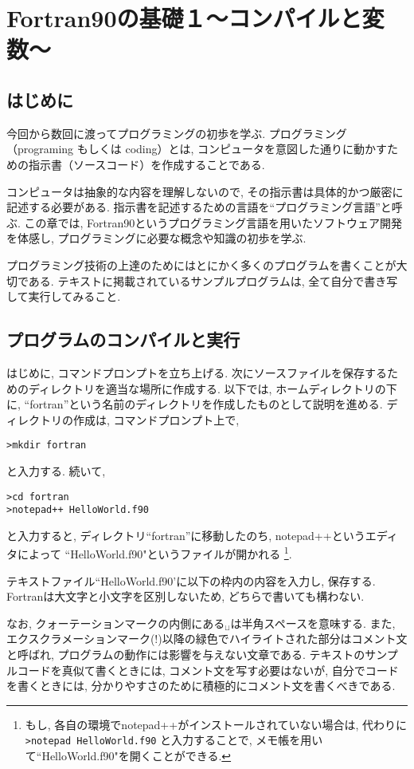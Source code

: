 \chapter{Fortran90の基礎１〜コンパイルと変数〜}

\section{はじめに}
今回から数回に渡ってプログラミングの初歩を学ぶ.
プログラミング（programing もしくは coding）とは,
コンピュータを意図した通りに動かすための指示書（ソースコード）を作成することである.

コンピュータは抽象的な内容を理解しないので, その指示書は具体的かつ厳密に記述する必要がある.
指示書を記述するための言語を``プログラミング言語''と呼ぶ.
この章では, Fortran90というプログラミング言語を用いたソフトウェア開発を体感し,
プログラミングに必要な概念や知識の初歩を学ぶ.

プログラミング技術の上達のためにはとにかく多くのプログラムを書くことが大切である.
テキストに掲載されているサンプルプログラムは,
全て自分で書き写して実行してみること.

\section{プログラムのコンパイルと実行}
はじめに, コマンドプロンプトを立ち上げる.
次にソースファイルを保存するためのディレクトリを適当な場所に作成する.
以下では, ホームディレクトリの下に, ``fortran''という名前のディレクトリを作成したものとして説明を進める.
ディレクトリの作成は, コマンドプロンプト上で,
\begin{Verbatim}[frame=single]
>mkdir fortran
\end{Verbatim}
と入力する. 続いて,
\begin{Verbatim}[frame=single]
>cd fortran
>notepad++ HelloWorld.f90
\end{Verbatim}
と入力すると,
ディレクトリ``fortran''に移動したのち, notepad++というエディタによって
``HelloWorld.f90"というファイルが開かれる
\footnote{もし, 各自の環境でnotepad++がインストールされていない場合は, 代わりに
\verb|>notepad HelloWorld.f90|
と入力することで, メモ帳を用いて``HelloWorld.f90"を開くことができる.
}.

テキストファイル``HelloWorld.f90'に以下の枠内の内容を入力し, 保存する.
Fortranは大文字と小文字を区別しないため, どちらで書いても構わない.

なお, クォーテーションマークの内側にある$_{\sqcup}$は半角スペースを意味する.
また, エクスクラメーションマーク(!)以降の緑色でハイライトされた部分はコメント文と呼ばれ,
プログラムの動作には影響を与えない文章である.
テキストのサンプルコードを真似て書くときには, コメント文を写す必要はないが,
自分でコードを書くときには, 分かりやすさのために積極的にコメント文を書くべきである.

